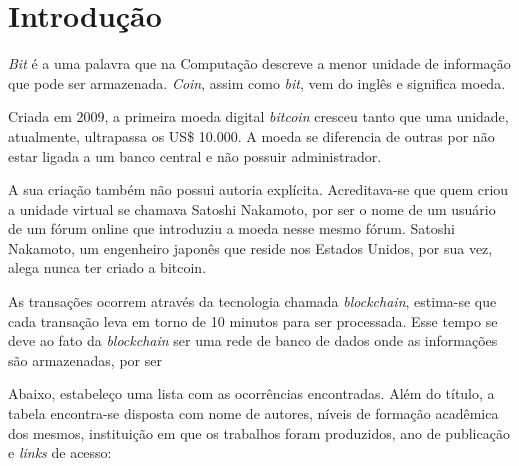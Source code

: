 \documentclass[12pt]{article}
\begin{document}
\section{Introdução}

\textit{Bit} é a uma palavra que na Computação descreve a menor unidade de informação que pode ser armazenada. \textit{Coin}, assim como \textit{bit}, vem do inglês e significa moeda.

Criada em 2009, a primeira moeda digital \textit{bitcoin} cresceu tanto que uma unidade, atualmente, ultrapassa os US\$ 10.000. A moeda se diferencia de outras por não estar ligada a um banco central e não possuir administrador.

A sua criação também não possui autoria explícita. Acreditava-se que quem criou a unidade virtual se chamava Satoshi Nakamoto, por ser o nome de um usuário de um fórum online que introduziu a moeda nesse mesmo fórum. Satoshi Nakamoto, um engenheiro japonês que reside nos Estados Unidos, por sua vez, alega nunca ter criado a bitcoin.

As transações ocorrem através da tecnologia chamada \textit{blockchain}, estima-se que cada transação leva em torno de 10 minutos para ser processada. Esse tempo se deve ao fato da \textit{blockchain} ser uma rede de banco de dados onde as informações são armazenadas, por ser

Abaixo, estabeleço uma lista com as ocorrências encontradas. Além do título, a tabela encontra-se disposta com nome de autores, níveis de formação acadêmica dos mesmos, instituição em que os trabalhos foram produzidos, ano de publicação e \textit{links} de acesso:
\end{document}
